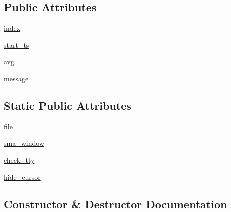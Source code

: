 \subsection*{Public Attributes}
\begin{DoxyCompactItemize}
\item 
\hyperlink{classpip_1_1__vendor_1_1progress_1_1Infinite_ac93e2c5c93be9e29672ff742b5a5e7bc}{index}
\item 
\hyperlink{classpip_1_1__vendor_1_1progress_1_1Infinite_a94182623ed10936ce36fb2881db518af}{start\+\_\+ts}
\item 
\hyperlink{classpip_1_1__vendor_1_1progress_1_1Infinite_a2fb01b69b10f953525c7a0327231cf66}{avg}
\item 
\hyperlink{classpip_1_1__vendor_1_1progress_1_1Infinite_adba57b5762fbe7cbfe4635242bb303e3}{message}
\end{DoxyCompactItemize}
\subsection*{Static Public Attributes}
\begin{DoxyCompactItemize}
\item 
\hyperlink{classpip_1_1__vendor_1_1progress_1_1Infinite_aea76d5738d1afbc62d1cb99be970d936}{file}
\item 
\hyperlink{classpip_1_1__vendor_1_1progress_1_1Infinite_a0cdc04fa086fe26f905ca31c6484fb70}{sma\+\_\+window}
\item 
\hyperlink{classpip_1_1__vendor_1_1progress_1_1Infinite_acb135db4091ffb7bf1249294b20bb2f6}{check\+\_\+tty}
\item 
\hyperlink{classpip_1_1__vendor_1_1progress_1_1Infinite_a0db00bd77e5a7cb3e7618e0530121159}{hide\+\_\+cursor}
\end{DoxyCompactItemize}


\subsection{Constructor \& Destructor Documentation}
\mbox{\label{classpip_1_1__vendor_1_1progress_1_1Infinite_ad71fba9b95a6f69f9240a759e46e09bf}} 
